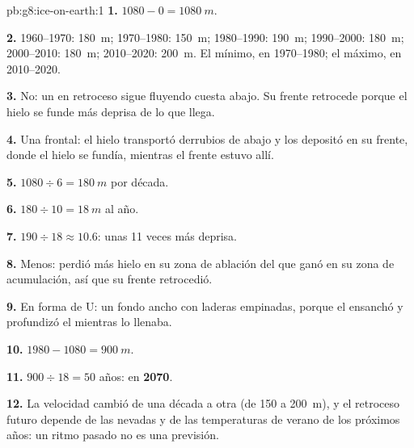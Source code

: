 \begin{solution}{pb:g8:ice-on-earth:1}
\textbf{1.} $1080 - 0 = \qty{1080}{m}$.

\textbf{2.} 1960--1970: \qty{180}{m}; 1970--1980: \qty{150}{m};
1980--1990: \qty{190}{m}; 1990--2000: \qty{180}{m}; 2000--2010:
\qty{180}{m}; 2010--2020: \qty{200}{m}. El mínimo, en 1970--1980; el
máximo, en 2010--2020.

\textbf{3.} No: un  en retroceso sigue fluyendo cuesta abajo. Su
frente retrocede porque el hielo se funde más deprisa de lo que llega.

\textbf{4.} Una  frontal: el hielo transportó derrubios de  
abajo y los depositó en su frente, donde el hielo se fundía, mientras el
frente estuvo allí.

\textbf{5.} $1080 \div 6 = \qty{180}{m}$ por década.

\textbf{6.} $180 \div 10 = \qty{18}{m}$ al año.

\textbf{7.} $190 \div 18 \approx 10.6$: unas 11 veces más deprisa.

\textbf{8.} Menos: perdió más hielo en su zona de ablación del que ganó en
su zona de acumulación, así que su frente retrocedió.

\textbf{9.} En forma de U: un fondo ancho con laderas empinadas, porque el
 ensanchó y profundizó el  mientras lo llenaba.

\textbf{10.} $1980 - 1080 = \qty{900}{m}$.

\textbf{11.} $900 \div 18 = 50$ años: en \textbf{2070}.

\textbf{12.} La velocidad cambió de una década a otra (de 150 a
\qty{200}{m}), y el retroceso futuro depende de las nevadas y de las
temperaturas de verano de los próximos años: un ritmo pasado no es una
previsión.
\end{solution}
